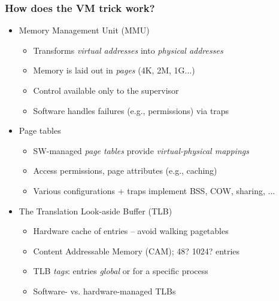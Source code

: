 \documentclass[pdftex]{beamer} %
\begin{document}
\begin{frame}
  \frametitle{How does the VM trick work?}

  \begin{itemize}

    \pause

    \item Memory Management Unit (MMU)
    \begin{itemize}
      \item Transforms \textit{virtual addresses} into \textit{physical addresses}
      \item Memory is laid out in \textit{pages} (4K, 2M, 1G...)
      \item Control available only to the supervisor
      \item Software handles failures (e.g., permissions) via traps
    \end{itemize}

    \medskip
    \pause

    \item Page tables
    \begin{itemize}
      \item SW-managed \textit{page tables} provide \textit{virtual-physical
	mappings}
      \item Access permissions, page attributes (e.g., caching)
      \item Various configurations + traps implement BSS, COW, sharing, ...
    \end{itemize}

    \medskip
    \pause

    \item The Translation Look-aside Buffer (TLB)
    \begin{itemize}
      \item Hardware cache of entries -- avoid walking pagetables
      \item Content Addressable Memory (CAM); 48? 1024? entries
      \item TLB \textit{tags}: entries \textit{global} or for a specific process
      \item Software- vs. hardware-managed TLBs
    \end{itemize}

    \medskip
    \pause

%

  \end{itemize}
\end{frame}
\end{document}
